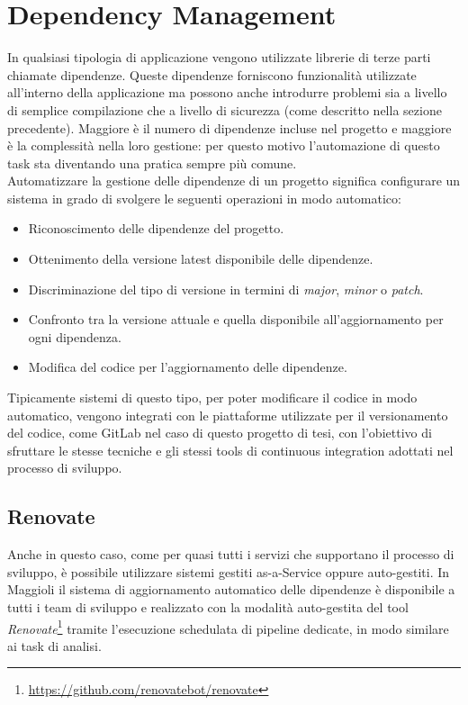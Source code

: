 \section{Dependency Management}
In qualsiasi tipologia di applicazione vengono utilizzate librerie di terze parti chiamate dipendenze. Queste dipendenze forniscono funzionalità utilizzate all'interno della applicazione ma possono anche introdurre problemi sia a livello di semplice compilazione che a livello di sicurezza (come descritto nella sezione precedente). Maggiore è il numero di dipendenze incluse nel progetto e maggiore è la complessità nella loro gestione: per questo motivo l'automazione di questo task sta diventando una pratica sempre più comune.\\
Automatizzare la gestione delle dipendenze di un progetto significa configurare un sistema in grado di svolgere le seguenti operazioni in modo automatico:
\begin{itemize}
    \item Riconoscimento delle dipendenze del progetto.
    \item Ottenimento della versione latest disponibile delle dipendenze.
    \item Discriminazione del tipo di versione in termini di \textit{major}, \textit{minor} o \textit{patch}.
    \item Confronto tra la versione attuale e quella disponibile all'aggiornamento per ogni dipendenza.
    \item Modifica del codice per l'aggiornamento delle dipendenze.
\end{itemize}

Tipicamente sistemi di questo tipo, per poter modificare il codice in modo automatico, vengono integrati con le piattaforme utilizzate per il versionamento del codice, come GitLab nel caso di questo progetto di tesi, con l'obiettivo di sfruttare le stesse tecniche e gli stessi tools di continuous integration adottati nel processo di sviluppo.

\subsection{Renovate}
Anche in questo caso, come per quasi tutti i servizi che supportano il processo di sviluppo, è possibile utilizzare sistemi gestiti as-a-Service oppure auto-gestiti. In Maggioli il sistema di aggiornamento automatico delle dipendenze è disponibile a tutti i team di sviluppo e realizzato con la modalità auto-gestita del tool \textit{Renovate}\footnote{\url{https://github.com/renovatebot/renovate}} tramite l'esecuzione schedulata di pipeline dedicate, in modo similare ai task di analisi.

